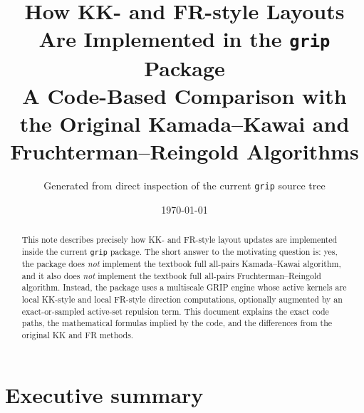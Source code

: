 \documentclass[11pt]{article}
\title{How KK- and FR-style Layouts Are Implemented in the \texttt{grip} Package\\
\large A Code-Based Comparison with the Original Kamada--Kawai and Fruchterman--Reingold Algorithms}
\author{Generated from direct inspection of the current \texttt{grip} source tree}
\date{\today}
\begin{document}
\maketitle

\begin{abstract}
This note describes precisely how KK- and FR-style layout updates are implemented
inside the current \texttt{grip} package. The short answer to the motivating
question is: yes, the package does \emph{not} implement the textbook full
all-pairs Kamada--Kawai algorithm, and it also does \emph{not} implement the
textbook full all-pairs Fruchterman--Reingold algorithm. Instead, the package
uses a multiscale GRIP engine whose active kernels are local KK-style and
local FR-style direction computations, optionally augmented by an exact-or-sampled
active-set repulsion term. This document explains the exact code paths, the
mathematical formulas implied by the code, and the differences from the original
KK and FR methods.
\end{abstract}

\section{Executive summary}
\end{document}
